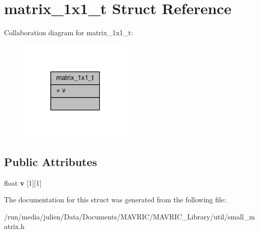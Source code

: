 \hypertarget{structmatrix__1x1__t}{\section{matrix\+\_\+1x1\+\_\+t Struct Reference}
\label{structmatrix__1x1__t}
}


Collaboration diagram for matrix\+\_\+1x1\+\_\+t\+:
\nopagebreak
\begin{figure}[H]
\begin{center}
\leavevmode
\includegraphics[width=153pt]{structmatrix__1x1__t__coll__graph}
\end{center}
\end{figure}
\subsection*{Public Attributes}
\begin{DoxyCompactItemize}
\item 
\hypertarget{structmatrix__1x1__t_a75776518dd598b5c059c353bb79b5dcc}{float {\bfseries v} \mbox{[}1\mbox{]}\mbox{[}1\mbox{]}}\label{structmatrix__1x1__t_a75776518dd598b5c059c353bb79b5dcc}

\end{DoxyCompactItemize}


The documentation for this struct was generated from the following file\+:\begin{DoxyCompactItemize}
\item 
/run/media/julien/\+Data/\+Documents/\+M\+A\+V\+R\+I\+C/\+M\+A\+V\+R\+I\+C\+\_\+\+Library/util/small\+\_\+matrix.\+h\end{DoxyCompactItemize}
